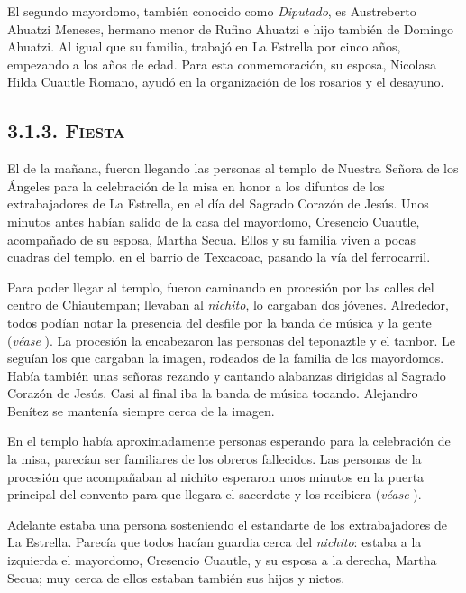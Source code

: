 \documentclass[14pt,letterpaper,twoside]{extbook} %
\begin{document}
El segundo mayordomo, también conocido como \textit{Diputado}, es Austreberto Ahuatzi Meneses, hermano menor de Rufino Ahuatzi e hijo también de Domingo Ahuatzi. Al igual que su familia, trabajó en La Estrella por cinco años, empezando a los  años de edad. Para esta conmemoración, su esposa, Nicolasa Hilda Cuautle Romano, ayudó en la organización de los rosarios y el desayuno.

\subsection*{\mdseries\large\textsc{3.1.3. Fiesta }}\label{Fiesta_2015}

\noindent El  de la mañana, fueron llegando las personas al templo de Nuestra Señora de los Ángeles para la celebración de la misa en honor a los difuntos de los extrabajadores de La Estrella, en el día del Sagrado Corazón de Jesús. Unos minutos antes habían salido de la casa del mayordomo, Cresencio Cuautle, acompañado de su esposa, Martha Secua. Ellos y su familia viven a pocas cuadras del templo, en el barrio de Texcacoac, pasando la vía del ferrocarril.

Para poder llegar al templo, fueron caminando en procesión por las calles del centro de Chiautempan; llevaban al \textit{nichito}, lo cargaban dos jóvenes. Alrededor, todos podían notar la presencia del desfile por la banda de música y la gente (\emph{véase} ). La procesión la encabezaron las personas del teponaztle y el tambor. Le seguían los que cargaban la imagen, rodeados de la familia de los mayordomos. Había también unas señoras rezando y cantando alabanzas dirigidas al Sagrado Corazón de Jesús. Casi al final iba la banda de música tocando. Alejandro Benítez se mantenía siempre cerca de la imagen.

En el templo había aproximadamente  personas esperando para la celebración de la misa, parecían ser familiares de los obreros fallecidos. Las personas de la procesión que acompañaban al nichito esperaron unos minutos en la puerta principal del convento para que llegara el sacerdote y los recibiera (\emph{véase} ).

Adelante estaba una persona sosteniendo el estandarte de los extrabajadores de La Estrella. Parecía que todos hacían guardia cerca del \textit{nichito}: estaba a la izquierda el mayordomo, Cresencio Cuautle, y su esposa a la derecha, Martha Secua; muy cerca de ellos estaban también sus hijos y nietos.
\end{document}
